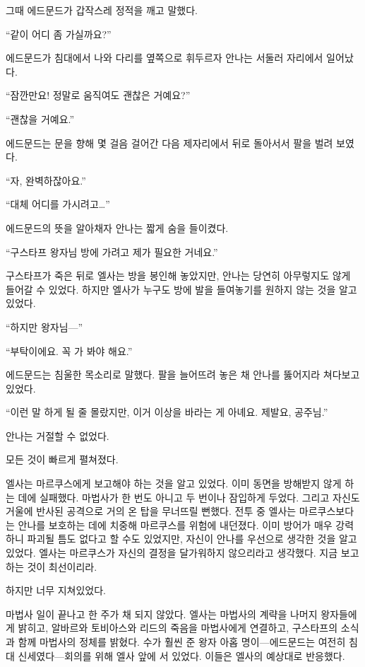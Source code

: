 그때 에드문드가 갑작스레 정적을 깨고 말했다.

``같이 어디 좀 가실까요?''

에드문드가 침대에서 나와 다리를 옆쪽으로 휘두르자 안나는 서둘러 자리에서 일어났다.

``잠깐만요! 정말로 움직여도 괜찮은 거예요?''

``괜찮을 거예요.''

에드문드는 문을 향해 몇 걸음 걸어간 다음 제자리에서 뒤로 돌아서서 팔을 벌려 보였다.

``자, 완벽하잖아요.''

``대체 어디를 가시려고\ldots''

에드문드의 뜻을 알아채자 안나는 짧게 숨을 들이켰다.

``구스타프 왕자님 방에 가려고 제가 필요한 거네요.''

구스타프가 죽은 뒤로 엘사는 방을 봉인해 놓았지만, 안나는 당연히 아무렇지도 않게 들어갈 수 있었다. 하지만 엘사가 누구도 방에 발을 들여놓기를 원하지 않는 것을 알고 있었다.

``하지만 왕자님—''

``부탁이에요. 꼭 가 봐야 해요.''

에드문드는 침울한 목소리로 말했다. 팔을 늘어뜨려 놓은 채 안나를 뚫어지라 쳐다보고 있었다.

``이런 말 하게 될 줄 몰랐지만, 이거 이상을 바라는 게 아녜요. 제발요, 공주님.''

안나는 거절할 수 없었다.

\textbreak

모든 것이 빠르게 펼쳐졌다.

엘사는 마르쿠스에게 보고해야 하는 것을 알고 있었다. 이미 동면을 방해받지 않게 하는 데에 실패했다. 마법사가 한 번도 아니고 두 번이나 잠입하게 두었다. 그리고 자신도 거울에 반사된 공격으로 거의 온 탑을 무너뜨릴 뻔했다. 전투 중 엘사는 마르쿠스보다는 안나를 보호하는 데에 치중해 마르쿠스를 위험에 내던졌다. 이미 방어가 매우 강력하니 파괴될 틈도 없다고 할 수도 있었지만, 자신이 안나를 우선으로 생각한 것을 알고 있었다. 엘사는 마르쿠스가 자신의 결정을 달가워하지 않으리라고 생각했다. 지금 보고하는 것이 최선이리라.

하지만 너무 지쳐있었다.

마법사 일이 끝나고 한 주가 채 되지 않았다. 엘사는 마법사의 계략을 나머지 왕자들에게 밝히고, 알바르와 토비아스와 리드의 죽음을 마법사에게 연결하고, 구스타프의 소식과 함께 마법사의 정체를 밝혔다. 수가 훨씬 준 왕자 아홉 명이—에드문드는 여전히 침대 신세였다—회의를 위해 엘사 앞에 서 있었다. 이들은 엘사의 예상대로 반응했다.

